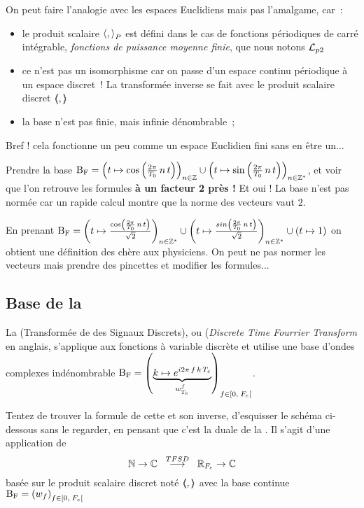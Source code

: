 
 On peut faire l'analogie avec les espaces Euclidiens mais pas l'amalgame, car~:
 \begin{itemize}
   \item le produit scalaire $\langle,{\rangle}_P$ est défini dans le cas de fonctions périodiques de carré intégrable, \emph{fonctions de puissance moyenne finie},  que nous notons $\mathcal{L}_{p 2}$
 \item ce n'est pas un isomorphisme car on passe d'un espace continu périodique à
   un espace discret~! La transformée inverse se fait avec le produit scalaire discret $\langle\!\!\langle,\rangle\!\!\rangle$
\item la base n'est pas finie, mais infinie dénombrable~;
\end{itemize}

Bref ! cela fonctionne un peu comme un espace Euclidien fini sans en être un...

\begin{exercice}
  Prendre la base  $\mathrm{B_F}=\left(t\mapsto \cos\left(\frac{2 \pi}{T_0}\,n\,t\right)\right)_{n\in\mathbb{Z}}\cup \left(t\mapsto \sin\left(\frac{2 \pi}{T_0}\,n\,t\right)\right)_{n\in\mathbb{Z}^*}$, et voir que l'on retrouve les formules \textbf{à un facteur 2 près !} Et oui ! La base n'est pas normée car un rapide calcul montre que la norme des vecteurs vaut $2$.

  En prenant $\mathrm{B_F}=\left(t\mapsto\frac{\cos\left(\frac{2 \pi}{T_0}\,n\,t\right)}{\sqrt{2}}\right)_{n\in\mathbb{Z}^*}\cup \left(t\mapsto \frac{sin\left(\frac{2 \pi}{T_0}\,n\,t\right)}{\sqrt{2}}\right)_{n\in\mathbb{Z}^*} \cup \left(t\mapsto 1\right)$ on obtient une définition des \sdf{} chère aux physiciens. On peut ne pas normer les vecteurs mais prendre des pincettes et modifier les formules...
\end{exercice}

\subsection{Base de la \TFSD{}}

La \TFSD{} (Transformée de \Fourier{} des Signaux Discrets), ou \DTFT{} (\emph{Discrete Time Fourrier Transform} en anglais, s'applique aux fonctions à variable discrète et utilise une base d'ondes complexes indénombrable $\mathrm{B_F}=\left(\underbrace{k\mapsto e^{i 2 \pi\,f\,k\,T_e}}_{w_{T_e}^f}\right)_{f\in\left[0,\;F_e\right[{}}$.

\begin{exercice}
Tentez de trouver la formule de cette \TFSD{}  et son inverse, d'esquisser le schéma ci-dessous sans le regarder, en pensant que c'est la \og{}duale\fg{} de la \sdf{}. Il s'agit d'une application de $$\mathbb{N}\rightarrow\mathbb{C}\;\;\overset{TFSD}{\longrightarrow}\;\;\mathbb{R}_{F_e}\rightarrow\mathbb{C}$$ basée sur le produit scalaire discret noté $\langle\!\!\langle,\rangle\!\!\rangle$ avec la base continue $\mathrm{B_F}=\left(w_f\right)_{f\in\left[0,\;F_e\right[}$
\end{exercice}

